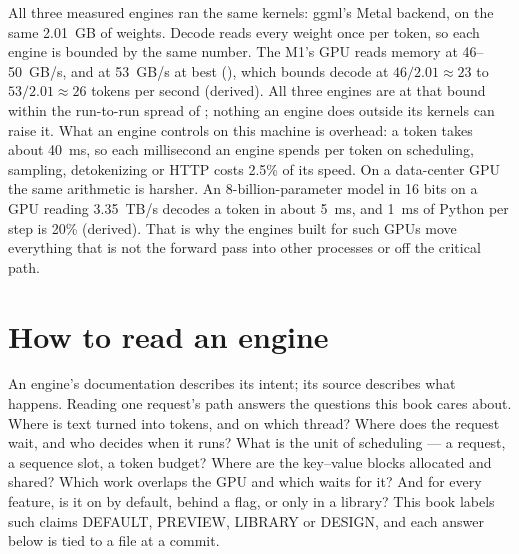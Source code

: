 

All three measured engines ran the same kernels: ggml's Metal backend, on the
same 2.01~GB of weights. Decode reads every weight once per token, so each engine
is bounded by the same number. The M1's GPU reads memory at 46--50~GB/s, and at
53~GB/s at best (), which bounds decode at $46/2.01 \approx 23$ to
$53/2.01 \approx 26$ tokens per second (derived). All three engines are at that
bound within the run-to-run spread of ; nothing an engine does
outside its kernels can raise it. What an engine controls on this machine is overhead: a
token takes about 40~ms, so each millisecond an engine spends per token on
scheduling, sampling, detokenizing or HTTP costs 2.5\% of its speed. On a
data-center GPU the same arithmetic is harsher. An 8-billion-parameter model in
16 bits on a GPU reading 3.35~TB/s decodes a token in about 5~ms, and 1~ms of
Python per step is 20\% (derived). That is why the engines built for such GPUs
move everything that is not the forward pass into other processes or off the
critical path.

\section{How to read an engine}

An engine's documentation describes its intent; its source describes what
happens. Reading one request's path answers the questions this book cares
about. Where is text turned into tokens, and on which thread? Where does the
request wait, and who decides when it runs? What is the unit of scheduling ---
a request, a sequence slot, a token budget? Where are the key--value blocks
allocated and shared? Which work overlaps the GPU and which waits for it? And
for every feature, is it on by default, behind a flag, or only in a library?
This book labels such claims DEFAULT, PREVIEW, LIBRARY or DESIGN, and each
answer below is tied to a file at a commit.

